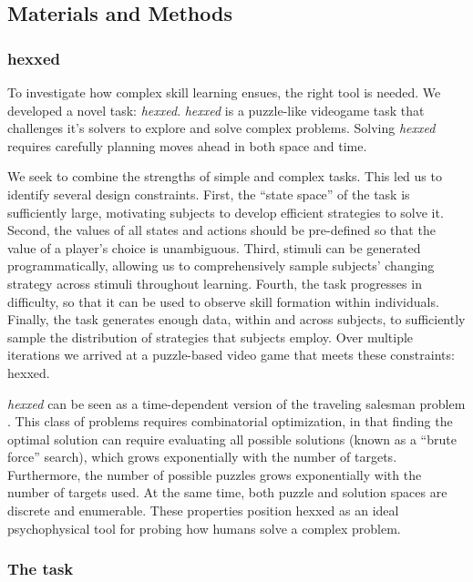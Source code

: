 \documentclass[11pt]{article}
\begin{document}
\subsection{Materials and Methods}
\subsubsection{hexxed}

To investigate how complex skill learning ensues, the right tool is needed. We developed a novel task: \textit{hexxed}.
\textit{hexxed} is a puzzle-like videogame task that challenges it's solvers to explore and solve complex problems. Solving \textit{hexxed} requires carefully planning moves ahead in both space and time.

We seek to combine the strengths of simple and complex tasks. This led us to identify several design constraints. First, the “state space” of the task is sufficiently large, motivating subjects to develop efficient strategies to solve it. Second, the values of all states and actions should be pre-defined so that the value of a player’s choice is unambiguous. Third, stimuli can be generated programmatically, allowing us to comprehensively sample subjects’ changing strategy across stimuli throughout learning. Fourth, the task progresses in difficulty, so that it can be used to observe skill formation within individuals. Finally, the task generates enough data, within and across subjects, to sufficiently sample the distribution of strategies that subjects employ. Over multiple iterations we arrived at a puzzle-based video game that meets these constraints: hexxed.

\textit{hexxed} can be seen as a time-dependent version of the traveling salesman problem \cite{gavish1978travelling}. This class of problems requires combinatorial optimization, in that finding the optimal solution can require evaluating all possible solutions (known as a “brute force” search), which grows exponentially with the number of targets. Furthermore, the number of possible puzzles grows exponentially with the number of targets used. At the same time, both puzzle and solution spaces are discrete and enumerable. These properties position hexxed as an ideal psychophysical tool for probing how humans solve a complex problem.


\subsubsection{The task}\label{the-task}
\end{document}
